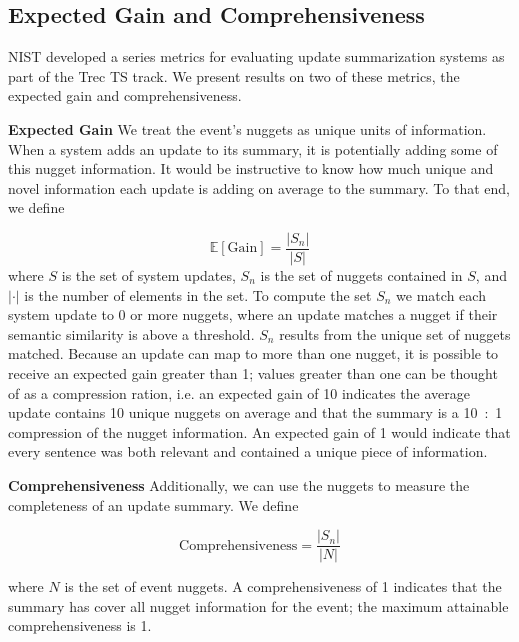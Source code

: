 \subsection{Expected Gain and Comprehensiveness}

NIST developed a series metrics for evaluating update summarization systems
as part of the Trec TS track.
We present results on two of these metrics, the expected gain and 
comprehensiveness.

\textbf{Expected Gain } We treat the event's nuggets as unique units of 
information.
When a system adds an update to its summary, it is potentially adding some
of this nugget information. It would be instructive to know how much unique
and novel information each update is adding on average to the summary.
To that end, we define

\[ \mathrm{\mathbb{E}[Gain]} = \frac{|S_n|}{|S|}%
\] 
where $S$ is the set of system updates, 
$S_n$ is the set of nuggets contained in $S$, and $|\cdot|$ is the number of
elements in the set.
To compute the set $S_n$ we match each system update to 0 or more nuggets, 
where an update matches a nugget if their semantic similarity is above 
a threshold. $S_n$ results from the unique set of nuggets matched.
Because an update can map to more than one nugget, it is possible to receive an
expected gain greater than 1; values greater than one can be thought of as a 
compression ration, i.e. an expected gain of 10 indicates the average update
contains 10 unique nuggets on average and that the summary is a 10~:~1 
compression of the nugget information.
An expected gain of 1 would indicate that every
sentence was both relevant and contained a unique piece of information.



\textbf{Comprehensiveness } Additionally, we can use the nuggets to measure the completeness of an update 
summary. We define

\[ \mathrm{Comprehensiveness} = \frac{|S_n|}{|N|}\]

where $N$ is the set of event nuggets.
A comprehensiveness of 1 indicates that the summary has cover 
all nugget information for the event; the maximum
attainable comprehensiveness is 1.


